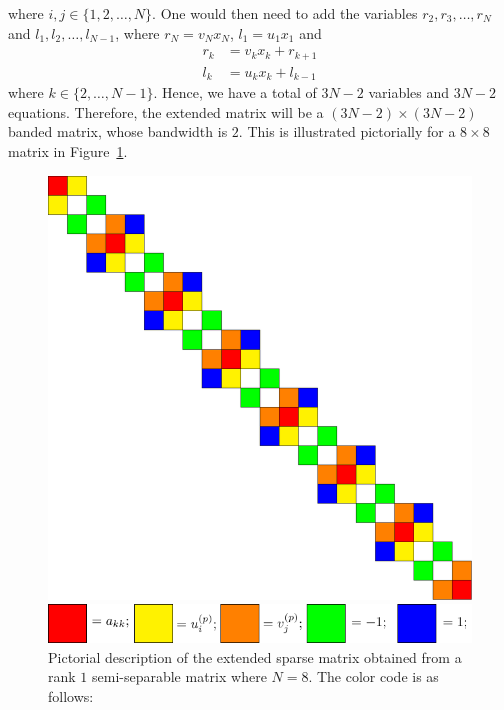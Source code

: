 \documentclass[final,leqno]{siamltex}
\begin{document}
where $i,j \in \{1,2,\ldots,N\}$. One would then need to add the variables $r_2,r_3,\ldots,r_N$ and $l_1,l_2,\ldots,l_{N-1}$, where $r_N = v_N x_N$, $l_1 = u_1x_1$ and
\begin{align}
r_k & = v_kx_k + r_{k+1}\\
l_k & = u_kx_k + l_{k-1}
\end{align}
where $k \in \{2,\ldots,N-1\}$. Hence, we have a total of $3N-2$ variables and $3N-2$ equations. Therefore, the extended matrix will be a $(3N-2) \times (3N-2)$ banded matrix, whose bandwidth is $2$. This is illustrated pictorially for a $8 \times 8$ matrix in Figure~\ref{fig_rank1_semiseparable}.

\begin{figure}[!htbp]
\begin{center}
\includegraphics[scale=0.5]{./images/1termsemiseparable/1termsemiseparable.pdf}
\end{center}
\begin{center}
\includegraphics[scale=1]{./images/colorcode.pdf}
\end{center}
\caption{Pictorial description of the extended sparse matrix obtained from a rank $1$ semi-separable matrix where $N=8$. The color code is as follows: }
\label{fig_rank1_semiseparable}
\end{figure}
\end{document}

